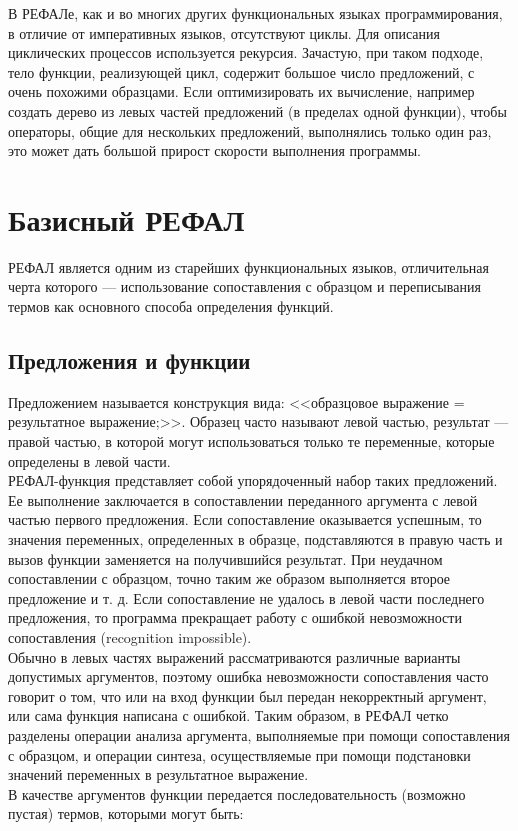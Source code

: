 \documentclass[12pt]{article}
\begin{document}
\indent В РЕФАЛе, как и во многих других функциональных языках программирования, в отличие от императивных языков, отсутствуют циклы. Для описания циклических процессов используется рекурсия. Зачастую, при таком подходе, тело функции, реализующей цикл, содержит большое число предложений, с очень похожими образцами. Если оптимизировать их вычисление, например создать дерево из левых частей предложений (в пределах одной функции), чтобы операторы, общие для нескольких предложений, выполнялись только один раз, это может дать большой прирост скорости выполнения программы.

\newpage

\section[Базисный РЕФАЛ]{\large \centering Базисный РЕФАЛ}
\hspace{\parindent}РЕФАЛ является одним из старейших функциональных языков, отличительная черта которого --- использование сопоставления с образцом и переписывания термов как основного способа определения функций.

\subsection[Предложения и функции]{\large Предложения и функции}
\hspace{\parindent}Предложением называется конструкция вида: <<образцовое выражение = результатное выражение;>>. Образец часто называют левой частью, результат --- правой частью, в которой могут использоваться только те переменные, которые определены в левой части.\\ \indent РЕФАЛ-функция представляет собой упорядоченный набор таких предложений. Ее выполнение заключается в сопоставлении переданного аргумента с левой частью первого предложения. Если сопоставление оказывается успешным, то значения переменных, определенных в образце, подставляются в правую часть и вызов функции заменяется на получившийся результат. При неудачном сопоставлении с образцом, точно таким же образом выполняется второе предложение и т. д. Если сопоставление не удалось в левой части последнего предложения, то программа прекращает работу с ошибкой невозможности сопоставления (recognition impossible).\\
\indent Обычно в левых частях выражений рассматриваются различные варианты допустимых аргументов, поэтому ошибка невозможности сопоставления часто говорит о том, что или на вход функции был передан некорректный аргумент, или сама функция написана с ошибкой. Таким образом, в РЕФАЛ четко разделены операции анализа аргумента, выполняемые при помощи сопоставления с образцом, и операции синтеза, осуществляемые при помощи подстановки значений переменных в результатное выражение. \\
\indent В качестве аргументов функции передается последовательность (возможно пустая) термов, которыми могут быть:
\end{document}
